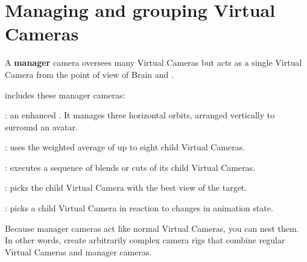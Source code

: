 \chapter{Managing and grouping Virtual Cameras}
\hypertarget{md__hey_tea_9_2_library_2_package_cache_2com_8unity_8cinemachine_0d2_89_87_2_documentation_0i_2_cinemachine_manager_cameras}{}\label{md__hey_tea_9_2_library_2_package_cache_2com_8unity_8cinemachine_0d2_89_87_2_documentation_0i_2_cinemachine_manager_cameras}
\label{md__hey_tea_9_2_library_2_package_cache_2com_8unity_8cinemachine_0d2_89_87_2_documentation_0i_2_cinemachine_manager_cameras_autotoc_md702}%
%
 A {\bfseries{manager}} camera oversees many Virtual Cameras but acts as a single Virtual Camera from the point of view of  Brain and .

 includes these manager cameras\+:


\begin{DoxyItemize}
\item {}\+: an enhanced . It manages three horizontal orbits, arranged vertically to surround an avatar.
\item {}\+: uses the weighted average of up to eight child Virtual Cameras.
\item {}\+: executes a sequence of blends or cuts of its child Virtual Cameras.
\item {}\+: picks the child Virtual Camera with the best view of the target.
\item {}\+: picks a child Virtual Camera in reaction to changes in animation state.
\end{DoxyItemize}

Because manager cameras act like normal Virtual Cameras, you can nest them. In other words, create arbitrarily complex camera rigs that combine regular Virtual Cameras and manager cameras. 